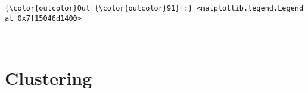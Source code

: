 \documentclass[11pt]{article}
\begin{document}
\begin{Verbatim}[commandchars=\\\{\}]
{\color{outcolor}Out[{\color{outcolor}91}]:} <matplotlib.legend.Legend at 0x7f15046d1400>
\end{Verbatim}
            
    \begin{center}
    \end{center}
    { \hspace*{\fill} \\}
    
    \hypertarget{clustering}{%
\section{Clustering}\label{clustering}}
\end{document}
